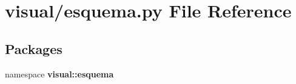 \section{visual/esquema.py \-File \-Reference}
\label{esquema_8py}
\subsection*{\-Packages}
\begin{DoxyCompactItemize}
\item 
namespace {\bf visual\-::esquema}
\end{DoxyCompactItemize}
